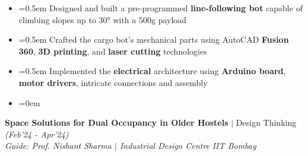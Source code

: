 \documentclass{article}
\begin{document}
\vspace{-5pt}
\begin{itemize}[label=\textcolor{myblue}{\textbullet},itemsep = -1.25mm, leftmargin=5.5mm]
\item{}\font=0.5em Designed and built a pre-programmed \textbf{line-following bot} capable of climbing slopes up to 30° with a 500g payload
\item{}\font=0.5em Crafted the cargo bot's mechanical parts using AutoCAD \textbf{Fusion 360}, \textbf{3D printing}, and \textbf{laser cutting} technologies
\item{}\font=0.5em Implemented the \textbf{electrical} architecture using \textbf{Arduino board}, \textbf{motor drivers}, intricate connections and assembly 
\item{}\font=0em 
\end{itemize}
{\fontsize{12}{12} \textbf{Space Solutions for Dual Occupancy in Older Hostels} $|$ Design Thinking}  \hfill{\sl \small (Feb’24 - Apr’24)}\\
{\it Guide: Prof. Nishant Sharma $|$ Industrial Design Centre} \hfill{\it IIT Bombay}\hspace{-2pt}
 
\vspace{-5pt}
 
\end{document}
